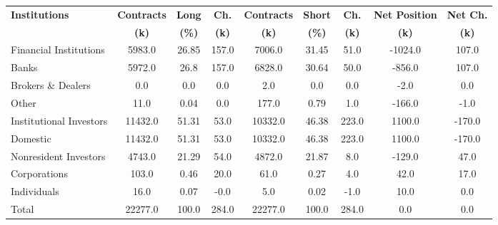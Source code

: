 \documentclass[article,crop=false]{standalone}%
\begin{document}
%
\normalsize%
\setlength{\tabcolsep}{0.15cm}%
\begin{tabular}[h]{l | c c c | c c c | c c}%
\hline%
\rowcolor{white}%
\textbf{Institutions}&\textbf{Contracts}&\textbf{Long}&\textbf{Ch.}&\textbf{Contracts}&\textbf{Short}&\textbf{Ch.}&\textbf{Net Position}&\textbf{Net Ch.}\\%
\rowcolor{white}%
\textbf{}&\textbf{(k)}&\textbf{(\%)}&\textbf{(k)}&\textbf{(k)}&\textbf{(\%)}&\textbf{(k)}&\textbf{(k)}&\textbf{(k)}\\%
\hline%
\rowcolor{lightgray}%
Financial Institutions&5983.0&26.85&157.0&7006.0&31.45&51.0&{-}1024.0&107.0\\%
\rowcolor{white}%
Banks&5972.0&26.8&157.0&6828.0&30.64&50.0&{-}856.0&107.0\\%
\rowcolor{lightgray}%
Brokers \& Dealers&0.0&0.0&0.0&2.0&0.0&0.0&{-}2.0&0.0\\%
\rowcolor{white}%
Other&11.0&0.04&0.0&177.0&0.79&1.0&{-}166.0&{-}1.0\\%
\rowcolor{lightgray}%
Institutional Investors&11432.0&51.31&53.0&10332.0&46.38&223.0&1100.0&{-}170.0\\%
\rowcolor{white}%
Domestic&11432.0&51.31&53.0&10332.0&46.38&223.0&1100.0&{-}170.0\\%
\rowcolor{lightgray}%
Nonresident Investors&4743.0&21.29&54.0&4872.0&21.87&8.0&{-}129.0&47.0\\%
\rowcolor{white}%
Corporations&103.0&0.46&20.0&61.0&0.27&4.0&42.0&17.0\\%
\rowcolor{lightgray}%
Individuals&16.0&0.07&{-}0.0&5.0&0.02&{-}1.0&10.0&0.0\\%
\rowcolor{white}%
Total&22277.0&100.0&284.0&22277.0&100.0&284.0&0.0&0.0\\%
\hline%
\end{tabular}%
\end{document}
